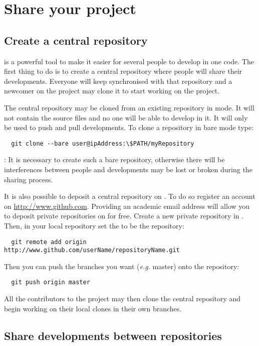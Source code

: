 \chapter{Share your project}

\section{Create a central  repository}

 is a powerful tool to make it easier for several people to develop in one code.
The first thing to do is to create a central repository where people will share their developments.
Everyone will keep synchronised with that repository and a newcomer on the project may clone it to start working on the project.

The central repository may be cloned from an existing repository in  mode.
It will not contain the source files and no one will be able to develop in it.
It will only be used to push and pull developments.
To clone a repository in bare mode type:
\begin{lstlisting}
  git clone --bare user@ipAddress:\$PATH/myRepository
\end{lstlisting}%

: It is necessary to create such a bare repository, otherwise there will be interferences between people and developments may be lost or broken during the sharing process.

It is also possible to deposit a central repository on . To do so register an account on \url{http://www.github.com}.
Providing an academic email address will allow you to deposit private repositories on  for free.
Create a new private repository in . Then, in your local repository set the  to be the  repository:
\begin{lstlisting}
  git remote add origin http://www.github.com/userName/repositoryName.git
\end{lstlisting}
Then you can push the branches you want (\textit{e.g.} master) onto the  repository:
\begin{lstlisting}
  git push origin master
\end{lstlisting}

All the contributors to the project may then clone the central repository and begin working on their local clones in their own branches.

\section{Share developments between  repositories}

